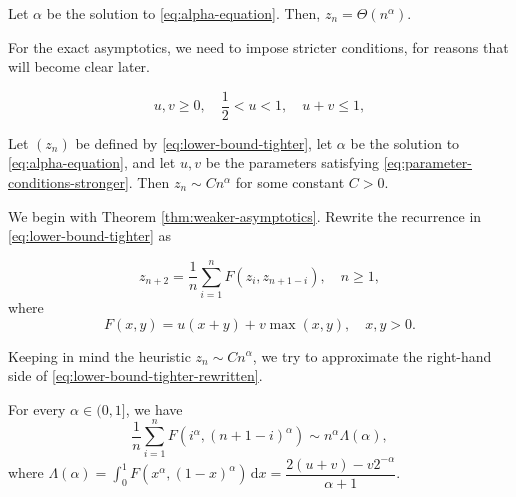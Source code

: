 \begin{theorem}
  \label{thm:theta-asymptotics}
  Let $\alpha$ be the solution to \eqref{eq:alpha-equation}. Then, $z_n = \Theta(n^{\alpha})$.
\end{theorem}

For the exact asymptotics, we need to impose stricter conditions, for reasons that will become clear later.

\begin{equation}
  \label{eq:parameter-conditions-stronger}
  u,v \ge 0, \quad \dfrac{1}{2} < u < 1, \quad u+v\le1,
\end{equation}

\begin{theorem}
  \label{thm:exact-asymptotics}
  Let $(z_n)$ be defined by \eqref{eq:lower-bound-tighter}, let $\alpha$ be the solution to \eqref{eq:alpha-equation}, and let $u,v$ be the parameters satisfying \eqref{eq:parameter-conditions-stronger}. Then $z_n\sim C n^\alpha$ for some constant $C > 0$.
\end{theorem}

We begin with Theorem \ref{thm:weaker-asymptotics}. Rewrite the recurrence in \eqref{eq:lower-bound-tighter} as

\begin{equation}
  \label{eq:lower-bound-tighter-rewritten}
  z_{n+2} = \dfrac{1}{n}\sum\limits_{i=1}^n F(z_i, z_{n+1-i}), \quad n \ge 1,
\end{equation}
where
\begin{equation}
  F(x,y) = u(x+y) + v\max(x,y), \quad x,y > 0.
\end{equation}

Keeping in mind the heuristic $z_n \sim Cn^\alpha$, we try to approximate the right-hand side of \eqref{eq:lower-bound-tighter-rewritten}.

\begin{lemma}
  \label{thm:asymptoics-of-history}
  For every $\alpha \in (0,1]$, we have
  $$\dfrac{1}{n}\sum\limits_{i=1}^n F(i^\alpha, (n+1-i)^\alpha) \sim n^\alpha \Lambda(\alpha),$$
  where $\Lambda(\alpha) = \int_0^1 F(x^\alpha, (1-x)^\alpha) \,\mathrm{d}x = \dfrac{2(u+v)-v2^{-\alpha}}{\alpha+1}.$
\end{lemma}

